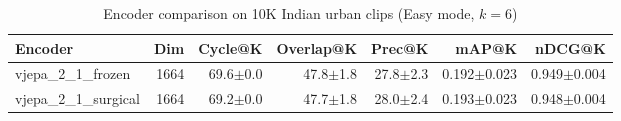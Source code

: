 \begin{table}[ht]
\centering
\caption{Encoder comparison on 10K Indian urban clips (Easy mode, $k=6$)}
\label{tab:encoder_comparison}
\begin{tabular}{lrrrrrr}
\toprule
Encoder & Dim & Cycle@K & Overlap@K & Prec@K & mAP@K & nDCG@K \\
\midrule
vjepa\_2\_1\_frozen & 1664 & 69.6{\tiny$\pm$0.0} & 47.8{\tiny$\pm$1.8} & 27.8{\tiny$\pm$2.3} & 0.192{\tiny$\pm$0.023} & 0.949{\tiny$\pm$0.004} \\
vjepa\_2\_1\_surgical & 1664 & 69.2{\tiny$\pm$0.0} & 47.7{\tiny$\pm$1.8} & 28.0{\tiny$\pm$2.4} & 0.193{\tiny$\pm$0.023} & 0.948{\tiny$\pm$0.004} \\
\bottomrule
\end{tabular}
\end{table}